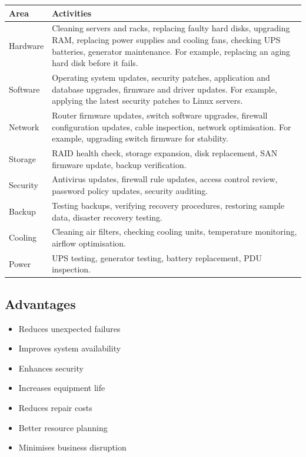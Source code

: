 \documentclass[11pt,a4paper]{article}
\begin{document}
\begin{tabularx}{\textwidth}{@{}lX@{}}
\toprule
\rowcolor{tablehead}\textbf{Area} & \textbf{Activities} \\
\midrule
Hardware & Cleaning servers and racks, replacing faulty hard disks, upgrading RAM, replacing
power supplies and cooling fans, checking UPS batteries, generator maintenance. For example,
replacing an aging hard disk before it fails. \\
\addlinespace
Software & Operating system updates, security patches, application and database upgrades,
firmware and driver updates. For example, applying the latest security patches to Linux
servers. \\
\addlinespace
Network & Router firmware updates, switch software upgrades, firewall configuration updates,
cable inspection, network optimisation. For example, upgrading switch firmware for
stability. \\
\addlinespace
Storage & RAID health check, storage expansion, disk replacement, SAN firmware update, backup
verification. \\
\addlinespace
Security & Antivirus updates, firewall rule updates, access control review, password policy
updates, security auditing. \\
\addlinespace
Backup & Testing backups, verifying recovery procedures, restoring sample data, disaster
recovery testing. \\
\addlinespace
Cooling & Cleaning air filters, checking cooling units, temperature monitoring, airflow
optimisation. \\
\addlinespace
Power & UPS testing, generator testing, battery replacement, PDU inspection. \\
\bottomrule
\end{tabularx}

\subsection{Advantages}

\begin{itemize}\itemsep2pt
  \item Reduces unexpected failures
  \item Improves system availability
  \item Enhances security
  \item Increases equipment life
  \item Reduces repair costs
  \item Better resource planning
  \item Minimises business disruption
\end{itemize}
\end{document}
